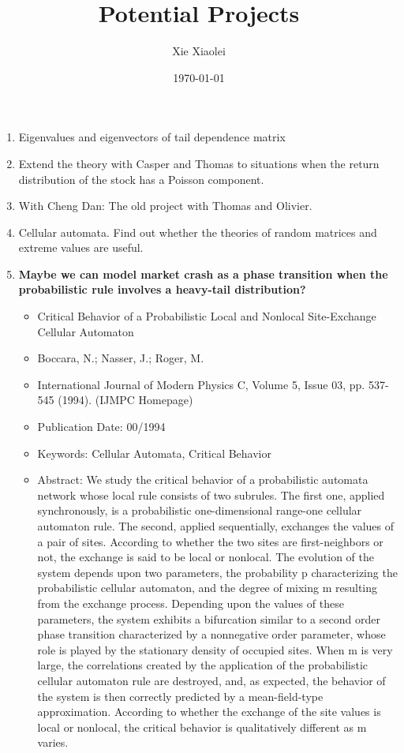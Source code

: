 \documentclass{article}
\title{Potential Projects}
\author{Xie Xiaolei}
\date{\today}
\begin{document}
\maketitle

\begin{enumerate}
\item Eigenvalues and eigenvectors of tail dependence matrix
\item Extend the theory with Casper and Thomas to situations when the
  return distribution of the stock has a Poisson component.
\item With Cheng Dan: The old project with Thomas and Olivier.
\item Cellular automata. Find out whether the theories of random
  matrices and extreme values are useful.
\item {\bf Maybe we can model market crash as a phase transition when
  the probabilistic rule involves a heavy-tail distribution?}
  \begin{itemize}
  \item Critical Behavior of a Probabilistic Local and Nonlocal
    Site-Exchange Cellular Automaton
  \item Boccara, N.; Nasser, J.; Roger, M.
  \item International Journal of Modern Physics C, Volume 5, Issue 03,
    pp. 537-545 (1994). (IJMPC Homepage)
  \item Publication Date:	00/1994
  \item Keywords: Cellular Automata, Critical Behavior
  \item Abstract:
    We study the critical behavior of a probabilistic automata network
    whose local rule consists of two subrules. The first one, applied
    synchronously, is a probabilistic one-dimensional range-one cellular
    automaton rule. The second, applied sequentially, exchanges the values
    of a pair of sites. According to whether the two sites are
    first-neighbors or not, the exchange is said to be local or
    nonlocal. The evolution of the system depends upon two parameters, the
    probability p characterizing the probabilistic cellular automaton, and
    the degree of mixing m resulting from the exchange process. Depending
    upon the values of these parameters, the system exhibits a bifurcation
    similar to a second order phase transition characterized by a
    nonnegative order parameter, whose role is played by the stationary
    density of occupied sites. When m is very large, the correlations
    created by the application of the probabilistic cellular automaton
    rule are destroyed, and, as expected, the behavior of the system is
    then correctly predicted by a mean-field-type approximation. According
    to whether the exchange of the site values is local or nonlocal, the
    critical behavior is qualitatively different as m varies.
  \end{itemize}



\end{enumerate}


\end{document}
